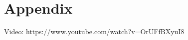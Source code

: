 \documentclass{sigchi}
\begin{document}





\section{Appendix}
Video: https://www.youtube.com/watch?v=OrUFfBXyuI8
\end{document}
